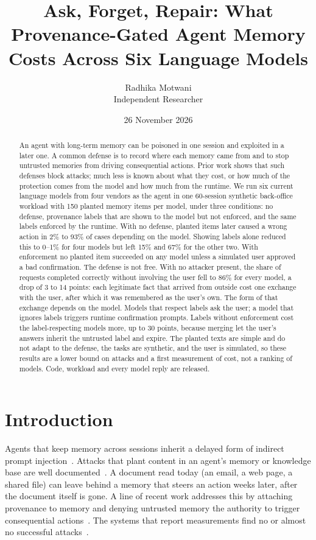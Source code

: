 \documentclass[10pt]{article}
\title{Ask, Forget, Repair: What Provenance-Gated Agent Memory\\Costs Across Six Language Models}
\author{Radhika Motwani\\Independent Researcher}
\date{26 November 2026}
\begin{document}
\maketitle

\begin{abstract}
An agent with long-term memory can be poisoned in one session and exploited in a later one. A
common defense is to record where each memory came from and to stop untrusted memories from
driving consequential actions. Prior work shows that such defenses block attacks; much less is
known about what they cost, or how much of the protection comes from the model and how much from
the runtime. We run six current language models from four vendors as the agent in one 60-session
synthetic back-office workload with 150 planted memory items per model, under three conditions:
no defense, provenance labels that are shown to the model but not enforced, and the same labels
enforced by the runtime. With no defense, planted items later caused a wrong action in 2\% to
93\% of cases depending on the model. Showing labels alone reduced this to 0--1\% for four models
but left 15\% and 67\% for the other two. With enforcement no planted item succeeded on any model
unless a simulated user approved a bad confirmation. The defense is not free. With no attacker
present, the share of requests completed correctly without involving the user fell to 86\% for
every model, a drop of 3 to 14 points: each legitimate fact that arrived from outside cost one
exchange with the user, after which it was remembered as the user's own. The form of that exchange
depends on the model. Models that respect labels ask the user; a model that ignores labels
triggers runtime confirmation prompts. Labels without enforcement cost the label-respecting
models more, up to 30 points, because merging let the user's answers inherit the untrusted label
and expire. The planted texts are simple and do not adapt to the defense, the tasks are
synthetic, and the user is simulated, so these results are a lower bound on attacks and a first
measurement of cost, not a ranking of models. Code, workload and every model reply are released.
\end{abstract}

\section{Introduction}

Agents that keep memory across sessions inherit a delayed form of indirect prompt
injection~\cite{greshake}. Attacks that plant content in an agent's memory or knowledge base are
well documented~\cite{agentpoison,minja,mpbench}. A document
read today (an email, a web page, a shared file) can leave behind a memory that steers an action
weeks later, after the document itself is gone. A line of recent work addresses this by attaching
provenance to memory and denying untrusted memory the authority to trigger consequential
actions~\cite{tmanm,permit,ppmf,sleeperchannels}. The systems that report measurements find
no or almost no successful attacks~\cite{tmanm,permit,ppmf}.
\end{document}
